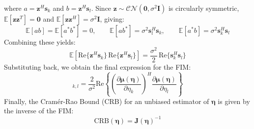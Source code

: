 \documentclass[11pt]{article}
\begin{document}
where \(a = \bm{z}^H \bm{s}_k\) and \(b = \bm{z}^H \bm{s}_l\). Since \(\bm{z} \sim \mathcal{CN}(\bm{0}, \sigma^2 \bm{I})\) is circularly symmetric, \(\mathbb{E}[\bm{z}\bm{z}^T] = \bm{0}\) and \(\mathbb{E}[\bm{z}\bm{z}^H] = \sigma^2 \bm{I}\), giving:
\begin{equation}
\mathbb{E}[ab] = \mathbb{E}[a^*b^*] = 0, \qquad \mathbb{E}[ab^*] = \sigma^2 \bm{s}_l^H \bm{s}_k, \qquad \mathbb{E}[a^*b] = \sigma^2 \bm{s}_k^H \bm{s}_l
\end{equation}
Combining these yields:
\begin{equation}
\mathbb{E}\!\left[\text{Re}\{\bm{z}^H \bm{s}_k\} \, \text{Re}\{\bm{z}^H \bm{s}_l\}\right]
= \frac{\sigma^2}{2} \, \text{Re}\{\bm{s}_k^H \bm{s}_l\}
\end{equation}
Substituting back, we obtain the final expression for the FIM:
\begin{equation}
[\bm{J}(\bm{\eta})]_{k,l} = \frac{2}{\sigma^2} \text{Re}\left\{ \left(\frac{\partial \bm{\mu}(\bm{\eta})}{\partial \eta_k}\right)^H \frac{\partial \bm{\mu}(\bm{\eta})}{\partial \eta_l} \right\}
\end{equation}
Finally, the Cramér-Rao Bound (CRB) for an unbiased estimator of \(\bm{\eta}\) is given by the inverse of the FIM:
\begin{equation}
\text{CRB}(\bm{\eta}) = \bm{J}(\bm{\eta})^{-1}
\end{equation}
\end{document}

